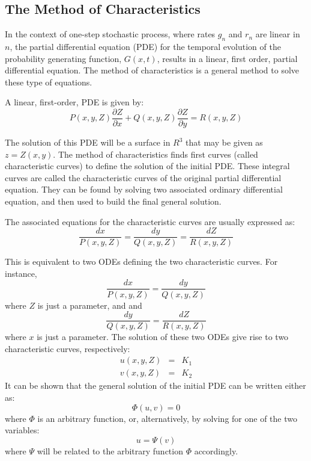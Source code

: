 \subsection{The Method of Characteristics}
\label{Appendix_Method_of_Characteristics}
In the context of one-step stochastic process, where rates $g_n$ and $r_n$ are linear in $n$, the partial differential equation (PDE) for the temporal evolution of the probability generating function, $G(x,t)$, results in a linear, first order, partial differential equation. The method of characteristics is a general method to solve these type of equations. 
\smallskip

A linear, first-order, PDE is given by:
\begin{equation}
P(x,y,Z) \frac{\partial Z}{\partial x} + Q(x,y,Z) \frac{\partial Z}{\partial y} = R(x,y,Z)
\end{equation}

The solution of this PDE will be a surface in $R^3$ that may be given as $z = Z(x,y)$. The method of characteristics finds first curves (called characteristic curves) to define the solution of the initial PDE. These integral curves are called the characteristic curves of the original partial differential equation. They can be found by solving two associated ordinary differential equation, and then used to build the final general solution. 
\smallskip

The associated equations for the characteristic curves are usually expressed as:
\begin{equation}
\frac{dx}{P(x,y,Z)} = \frac{dy}{Q(x,y,Z)}  = \frac{dZ}{R(x,y,Z)}
\end{equation}

This is equivalent to two ODEs defining the two characteristic curves. For instance, 
\begin{equation}
\frac{dx}{P(x,y,Z)} = \frac{dy}{Q(x,y,Z)}
\end{equation}
where $Z$ is just a parameter, and 
and 
\begin{equation}
\frac{dy}{Q(x,y,Z)} = \frac{dZ}{R(x,y,Z)}
\end{equation}
where $x$ is just a parameter.  The solution of these two ODEs give rise to two characteristic curves, respectively:
\begin{eqnarray}
\label{eq:1stcurve}
u(x,y,Z) & = & K_1 \\
v(x,y,Z) & = & K_2 
\label{eq:2ndcurve}
\end{eqnarray}
It can be shown that the general solution of the initial PDE can be written either as:
\begin{equation}
\Phi(u,v) = 0
\end{equation}
where $\Phi$ is an arbitrary function, or, alternatively, by solving for one of the two variables:
\begin{equation}
u = \Psi(v)
\end{equation}
where $\Psi$ will be related to the arbitrary function $\Phi$ accordingly. 
\bigskip

